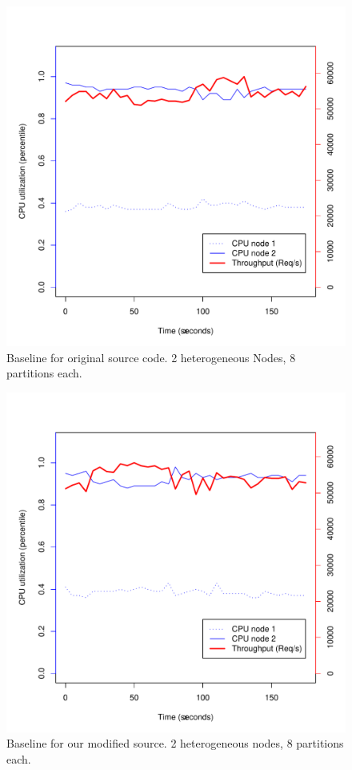 

\begin{figure}[h]
    \centering
    \includegraphics[width=1.2\textwidth]{results/baseline_originalsrc_v182}
    \caption{Baseline for original source code. 2 heterogeneous Nodes, 8 partitions each.}
    \label{fig:baseline}
\end{figure}

\begin{figure}[h]
    \centering
    \includegraphics[width=1.2\textwidth]{results/baseline_plot}
    \caption{Baseline for our modified source. 2 heterogeneous nodes, 8 partitions each.}
    \label{fig:baseline}
\end{figure}

